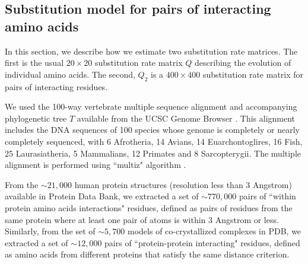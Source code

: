 \subsection{Substitution model for pairs of interacting amino acids}

In this section, we describe how we estimate two substitution rate matrices. The first is the usual $20 \times 20$ substitution rate matrix $Q$ describing the evolution of individual amino acids. The second, $Q_2$ is a $400 \times 400$ substitution rate matrix for pairs of interacting residues. 

We used the 100-way vertebrate multiple sequence alignment and accompanying phylogenetic tree $T$ available from the UCSC Genome Browser \cite{karolchik2014ucsc}. This alignment includes the DNA sequences of 100 species whose genome is completely or nearly completely sequenced, with 6 Afrotheria, 14 Avians, 14 Euarchontoglires, 16 Fish, 25 Laurasiatheria, 5 Mammalians, 12 Primates and 8 Sarcopterygii. The multiple alignment is performed using ``multiz" algorithm \cite{blanchette2004aligning,kielbasa2011adaptive}.

From the $\sim21,000$ human protein structures (resolution less than 3 Angstrom) available in Protein Data Bank, we extracted a set of $\sim770,000$ pairs of “within protein amino acids interactions" residues, defined as pairs of residues from the same protein where at least one pair of atoms is within 3 Angstrom or less. Similarly, from the set of $\sim5,700$ models of co-crystallized complexes in PDB, we extracted a set of $\sim12,000$ pairs of “protein-protein interacting" residues, defined as amino acids from different proteins that satisfy the same distance criterion.

